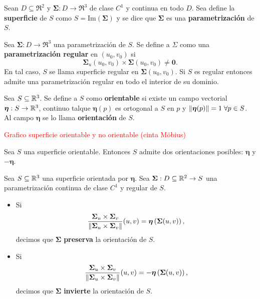 \begin{definition}
    Sean $D\subseteq\Re^2$ y $\boldsymbol{\Sigma}:D\to\Re^3$ de clase $C^1$ y continua en todo $D$. Sea define la \textbf{superficie} de $S$ como $S=\text{Im}(\boldsymbol{\Sigma})$ y se dice que $\boldsymbol{\Sigma}$ es una \textbf{parametrizaci\'on} de $S$.
\end{definition}

\begin{definition}
    Sea $\boldsymbol{\Sigma}:D\to\Re^3$ una parametrizaci\'on de $S$. Se define a $\Sigma$ como una \textbf{parametrizaci\'on regular} en $(u_0, v_0)$ si
    \[
        \boldsymbol{\Sigma}_u(u_0,v_0)\times\boldsymbol{\Sigma}(u_0,v_0)\neq \boldsymbol{0}.
    \]
    En tal caso, $S$ se llama superficie regular en $\boldsymbol{\Sigma}(u_0,v_0)$. Si $S$ es regular entonces admite una parametrizaci\'on regular en todo el interior de su dominio.
\end{definition}

\begin{definition}
    Sea $S\subseteq\mathbb{R}^3$. Se define a $S$ como \textbf{orientable} si existe un campo vectorial $\boldsymbol{\eta}:S\to\mathbb{R}^3$, continuo talque $\boldsymbol{\eta}(p)$ es ortogonal a $S$ en $p$ y $\norm{\boldsymbol{\eta}(p)}=1\;\forall p\in S$. Al campo $\boldsymbol{\eta}$ se lo llama \textbf{orientaci\'on} de $S$.
\end{definition}

\textcolor{red}{Grafico superficie orientable y no orientable (cinta Möbius)}

\begin{obs}
    Sea $S$ una superficie orientable. Entonces $S$ admite dos orientaciones posibles: $\boldsymbol{\eta}$ y $-\boldsymbol{\eta}$.
\end{obs}

\begin{definition}
    Sea $S\subseteq\mathbb{R}^3$ una superficie orientada por $\boldsymbol{\eta}$. Sea $\boldsymbol{\Sigma}:D\subseteq\mathbb{R}^2\to S$ una parametrizaci\'on continua de clase $C^1$ y regular de $S$.
    \begin{itemize}
        \item Si \[
            \frac{\boldsymbol{\Sigma}_u\times\boldsymbol{\Sigma}_v}{\norm{\boldsymbol{\Sigma}_u\times\boldsymbol{\Sigma}_v}}(u,v)=\boldsymbol{\eta}\left(\boldsymbol{\Sigma}(u,v)\right),
        \]  
        decimos que $\boldsymbol{\Sigma}$ \textbf{preserva} la orientaci\'on de $S$.
        \item Si \[
            \frac{\boldsymbol{\Sigma}_u\times\boldsymbol{\Sigma}_v}{\norm{\boldsymbol{\Sigma}_u\times\boldsymbol{\Sigma}_v}}(u,v)=-\boldsymbol{\eta}\left(\boldsymbol{\Sigma}(u,v)\right),
        \]
        decimos que $\boldsymbol{\Sigma}$ \textbf{invierte} la orientaci\'on de $S$.  
    \end{itemize}
\end{definition}

